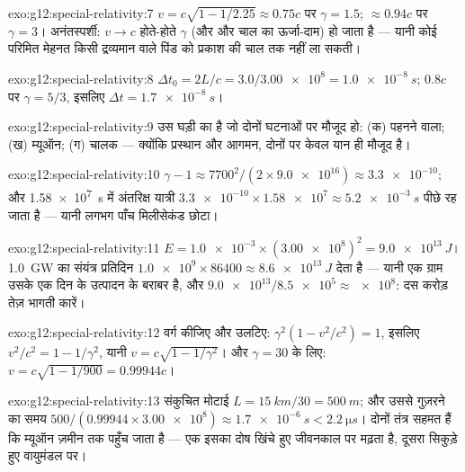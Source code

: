\begin{solution}{exo:g12:special-relativity:7}
$v = c\sqrt{1 - 1/2.25} \approx 0.75c$ पर $\gamma = 1.5$; $\approx 0.94c$ पर $\gamma = 3$। अनंतस्पर्शी: $v \to c$ होते-होते $\gamma$ (और
और चाल का ऊर्जा-दाम)  हो जाता है --- यानी कोई परिमित मेहनत किसी
द्रव्यमान वाले पिंड को प्रकाश की चाल तक नहीं ला सकती।
\end{solution}

\begin{solution}{exo:g12:special-relativity:8}
$\Delta t_0 = 2L/c = 3.0/\num{3.00e8} = \qty{1.0e-8}{s}$; $0.8c$ पर $\gamma = 5/3$, इसलिए $\Delta t = \qty{1.7e-8}{s}$।
\end{solution}

\begin{solution}{exo:g12:special-relativity:9}
 उस घड़ी का है जो दोनों घटनाओं पर मौजूद हो: (क) पहनने
वाला; (ख) म्यूऑन; (ग) चालक --- क्योंकि प्रस्थान और आगमन, दोनों पर केवल यान ही
मौजूद है।
\end{solution}

\begin{solution}{exo:g12:special-relativity:10}
$\gamma - 1 \approx 7700^2/(2 \times \num{9.0e16}) \approx
\num{3.3e-10}$; और \qty{1.58e7}{s} में अंतरिक्ष यात्री $\num{3.3e-10} \times \num{1.58e7} \approx \qty{5.2e-3}{s}$ पीछे रह जाता है --- यानी लगभग
पाँच मिलीसेकंड छोटा।
\end{solution}

\begin{solution}{exo:g12:special-relativity:11}
$E = \num{1.0e-3} \times (\num{3.00e8})^2 = \qty{9.0e13}{J}$। \qty{1.0}{GW} का संयंत्र प्रतिदिन $\num{1.0e9} \times 86400 \approx
\qty{8.6e13}{J}$ देता है --- यानी एक ग्राम उसके एक दिन
के उत्पादन के बराबर है, और $\num{9.0e13}/\num{8.5e5} \approx \num{e8}$: दस करोड़ तेज़ भागती कारें।
\end{solution}

\begin{solution}{exo:g12:special-relativity:12}
वर्ग कीजिए और उलटिए: $\gamma^2(1 - v^2/c^2) = 1$, इसलिए $v^2/c^2 = 1 - 1/\gamma^2$, यानी $v = c\sqrt{1 - 1/\gamma^2}$। और $\gamma = 30$ के लिए:
$v = c\sqrt{1 - 1/900} = 0.99944c$।
\end{solution}

\begin{solution}{exo:g12:special-relativity:13}
संकुचित मोटाई $L = \qty{15}{km}/30 = \qty{500}{m}$; और उससे गुज़रने का समय $500/(0.99944 \times \num{3.00e8}) \approx \qty{1.7e-6}{s} <
\qty{2.2}{\micro s}$। दोनों तंत्र सहमत हैं कि
म्यूऑन ज़मीन तक पहुँच जाता है --- एक इसका दोष खिंचे हुए जीवनकाल पर मढ़ता है,
दूसरा सिकुड़े हुए वायुमंडल पर।
\end{solution}

